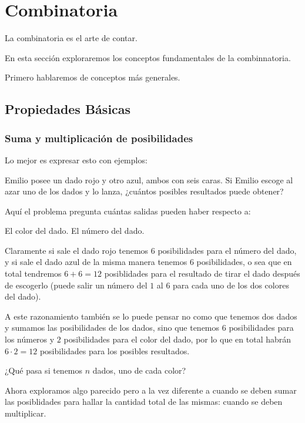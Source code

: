 \part{Combinatoria}
La combinatoria es el arte de contar.

En esta sección exploraremos los conceptos
fundamentales de la combinnatoria.

Primero hablaremos de conceptos más
generales.

\chapter{Propiedades Básicas}
\section{Suma y multiplicación de posibilidades}
Lo mejor es expresar esto con ejemplos:
\begin{example}
	Emilio posee un dado rojo y otro azul,
	ambos con seis caras. Si Emilio
	escoge al azar uno de los dados y lo
	lanza, ¿cuántos posibles resultados
	puede obtener?
\end{example}

Aquí el problema pregunta cuántas
salidas pueden haber respecto a:
\begin{itemize}
	\ii El color del dado.
	\ii El número del dado.
\end{itemize}

Claramente si sale el dado rojo
tenemos $6$ posibilidades para
el número del dado,
y si sale el dado azul de la misma manera
tenemos $6$ posibilidades, o sea que
en total tendremos $6 + 6 = 12$ posiblidades
para el resultado de tirar el dado
después de escogerlo (puede salir
un número del $1$ al $6$ para
cada uno de los dos colores del dado).

A este razonamiento también se lo
puede pensar no como que tenemos
dos dados y sumamos
las posibilidades de los dados,
sino que tenemos $6$ posibilidades
para los números y $2$ posibilidades para
el color del dado, por lo que
en total habrán $6 \cdot 2 = 12$
posibilidades para los posibles resultados.

\begin{question*}
	¿Qué pasa si tenemos $n$ dados,
	uno de cada color?
\end{question*}

Ahora exploramos algo parecido
pero a la vez diferente a cuando
se deben sumar las posiblidades para
hallar la cantidad total de las mismas:
cuando se deben multiplicar.

